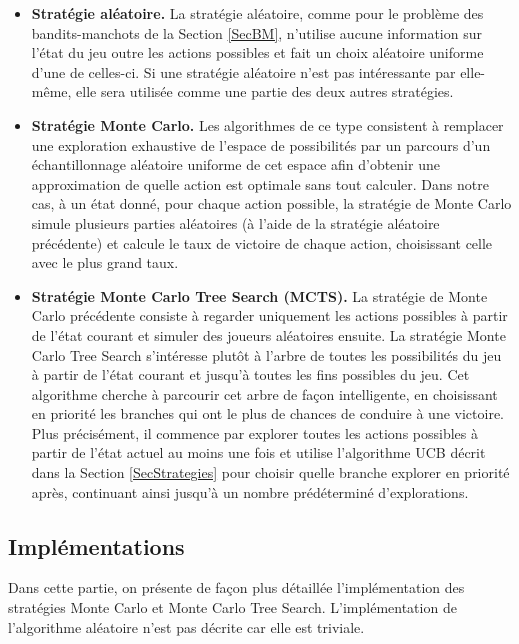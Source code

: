 \documentclass[a4paper,12pt]{article}
\begin{document}
\begin{itemize}[label=\textbullet, leftmargin=*]
\item \textbf{Stratégie aléatoire.} La stratégie aléatoire, comme pour le problème des bandits-manchots de la Section \ref{SecBM}, n'utilise aucune information sur l'état du jeu outre les actions possibles et fait un choix aléatoire uniforme d'une de celles-ci. Si une stratégie aléatoire n'est pas intéressante par elle-même, elle sera utilisée comme une partie des deux autres stratégies.

\item \textbf{Stratégie Monte Carlo.} Les algorithmes de ce type consistent à remplacer une exploration exhaustive de l'espace de possibilités par un parcours d'un échantillonnage aléatoire uniforme de cet espace afin d'obtenir une approximation de quelle action est optimale sans tout calculer. Dans notre cas, à un état donné, pour chaque action possible, la stratégie de Monte Carlo simule plusieurs parties aléatoires (à l'aide de la stratégie aléatoire précédente) et calcule le taux de victoire de chaque action, choisissant celle avec le plus grand taux.

\item \textbf{Stratégie Monte Carlo Tree Search (MCTS).} La stratégie de Monte Carlo précédente consiste à regarder uniquement les actions possibles à partir de l'état courant et simuler des joueurs aléatoires ensuite. La stratégie Monte Carlo Tree Search s'intéresse plutôt à l'arbre de toutes les possibilités du jeu à partir de l'état courant et jusqu'à toutes les fins possibles du jeu. Cet algorithme cherche à parcourir cet arbre de façon intelligente, en choisissant en priorité les branches qui ont le plus de chances de conduire à une victoire. Plus précisément, il commence par explorer toutes les actions possibles à partir de l'état actuel au moins une fois et utilise l'algorithme UCB décrit dans la Section \ref{SecStrategies} pour choisir quelle branche explorer en priorité après, continuant ainsi jusqu'à un nombre prédéterminé d'explorations.
\end{itemize}

\subsection{Implémentations}

Dans cette partie, on présente de façon plus détaillée l'implémentation des stratégies Monte Carlo et Monte Carlo Tree Search. L'implémentation de l'algorithme aléatoire n'est pas décrite car elle est triviale.
\end{document}
